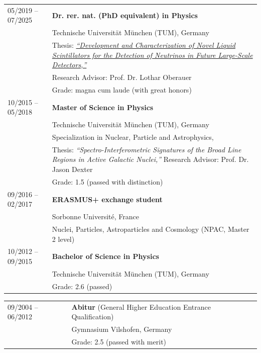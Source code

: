 \documentclass[letterpaper,12pt, oneside]{article}
\begin{document}
\begin{tabular}{@{} l p{13cm}}
05/2019 – 07/2025 & \textbf{Dr. rer. nat. (PhD equivalent) in Physics} \\
                  & Technische Universit\"at M\"unchen (TUM), Germany \\
                  & Thesis:
                  \href{https://mediatum.ub.tum.de/?id=1782355}{\textit{“Development and Characterization of Novel Liquid Scintillators for the Detection of Neutrinos in Future Large-Scale Detectors,”}}\\
                  & Research Advisor: Prof. Dr. Lothar Oberauer \\
                  & Grade: magna cum laude (with great honors) \vspace{0.35em} \\

10/2015 – 05/2018 &\textbf{Master of Science in Physics} \\
                  & Technische Universit\"at M\"unchen (TUM), Germany \\
                  & Specialization in Nuclear, Particle and Astrophysics, \\
                  & Thesis: \textit{“Spectro-Interferometric Signatures of the Broad Line Regions in Active Galactic Nuclei,”} Research Advisor: Prof. Dr. Jason Dexter \\
                  & Grade: 1.5 (passed with distinction) \vspace{0.22em} \\
09/2016 – 02/2017 & \textbf{ERASMUS+ exchange student} \\
                  & Sorbonne Université, France \\
                  & Nuclei, Particles, Astroparticles and Cosmology (NPAC, Master 2 level) \vspace{0.22em} \\
10/2012 – 09/2015 & \textbf{Bachelor of Science in Physics} \\
                  & Technische Universit\"at M\"unchen (TUM), Germany \\
                  & Grade: 2.6 (passed) \vspace{0.22em} \\
\end{tabular}
\newpage
\begin{tabular}{@{} l p{13cm}}
09/2004 – 06/2012 & \textbf{Abitur} (General Higher Education Entrance Qualification) \\
                  & {Gymnasium Vilshofen}, {Germany}  \\
                  & Grade: 2.5 (passed with merit)  \\
\end{tabular}
\vspace{1em}
\noindent
\end{document}
